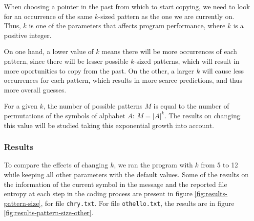 \documentclass{article}
\begin{document}
When choosing a pointer in the past from which to start copying, we need to look for an occurrence of the same $k$-sized pattern as the one we are currently on.
Thus, $k$ is one of the parameters that affects program performance, where $k$ is a positive integer.

On one hand, a lower value of $k$ means there will be more occurrences of each pattern, since there will be lesser possible $k$-sized patterns, which will result in more oportunities to copy from the past.
On the other, a larger $k$ will cause less occurrences for each pattern, which results in more scarce predictions, and thus more overall guesses.

For a given $k$, the number of possible patterns $M$ is equal to the number of permutations of the symbols of alphabet $A$: $M = \vert A \vert ^ k$.
The results on changing this value will be studied taking this exponential growth into account.

\subsubsection{Results}

To compare the effects of changing $k$, we ran the program with $k$ from 5 to 12 while keeping all other parameters with the default values.
Some of the results on the information of the current symbol in the message and the reported file entropy at each step in the coding process are
present in figure \ref{fig:results-pattern-size}, for file \verb|chry.txt|.
For file \verb|othello.txt|, the results are in figure \ref{fig:results-pattern-size-other}.
\end{document}
